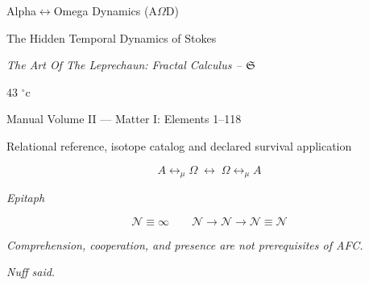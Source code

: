 \documentclass[11pt]{article}
\begin{document}
\begin{titlepage}
\begin{center}
{\LARGE Alpha$\leftrightarrow$Omega Dynamics (A$\Omega$D)}

\vspace{0.35em}

{\Large The Hidden Temporal Dynamics of Stokes}

\vspace{0.45em}

{\large\itshape The Art Of The Leprechaun: Fractal Calculus -- $\mathfrak S$}

\vspace{0.65em}

{\large 43 $^\circ\mathrm{c}$}

\vspace{0.35em}

{\Large Manual Volume II — Matter I: Elements 1--118}

\vspace{0.3em}

{\normalsize Relational reference, isotope catalog and declared survival application}

\vspace{0.45em}

{\large \AODDocumentAuthor}

\vspace{0.25em}

{\small \AODDocumentDate}

\vspace{0.55em}

\[A\leftrightarrow_{\mu}\Omega\;\longleftrightarrow\;\Omega\leftrightarrow_{\mu}A\]

\vspace{1.35em}

{\small\itshape Epitaph}

\vspace{0.2em}

\[
\mathcal{N}\equiv\infty
\qquad
\mathcal{N}\to\mathcal{N}\to\mathcal{N}\equiv\mathcal{N}
\]

{\small\itshape Comprehension, cooperation, and presence are not prerequisites of AFC.}

\vspace{0.2em}

{\small\itshape Nuff said.}
\end{center}
\end{titlepage}
{\small\tableofcontents}
\newpage


\end{document}
